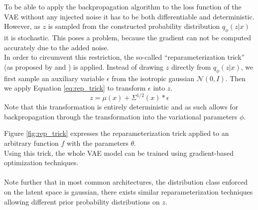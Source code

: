 To be able to apply the backpropagation\cite{backprop:1988} algorithm to the loss function of the VAE without any injected noise it has to be both differentiable and deterministic.
However, as $z$ is sampled from the constructed probability distribution $q_\phi(z|x)$ it is stochastic.
This poses a problem, because the gradient can not be computed accurately due to the added noise.\\
In order to circumvent this restriction, the so-called ``reparameterization trick'' (as proposed by \cite{vae:2014} and \cite{dlgm:2014}) is applied.
Instead of drawing $z$ directly from $q_\phi(z|x)$, we first sample an auxiliary variable $\epsilon$ from the isotropic gaussian $\mathcal{N}(0, I)$. Then we apply Equation \ref{eq:rep_trick} to transform $\epsilon$ into $z$.
\begin{equation}
  \label{eq:rep_trick}
  z = \mu(x) + \Sigma^{1/2}(x)*\epsilon
\end{equation}
Note that this transformation is entirely deterministic and as such allows for backpropagation through the transformation into the variational parameters $\phi$.

Figure \ref{fig:rep_trick} expresses the reparameterization trick applied to an arbitrary function $f$ with the parameters $\theta$.\\
Using this trick, the whole VAE model can be trained using gradient-based optimization techniques.\\\\

Note further that in most common architectures, the distribution class enforced on the latent space is gaussian, there exists similar reparameterization techniques allowing different prior probability distributions on $z$.








